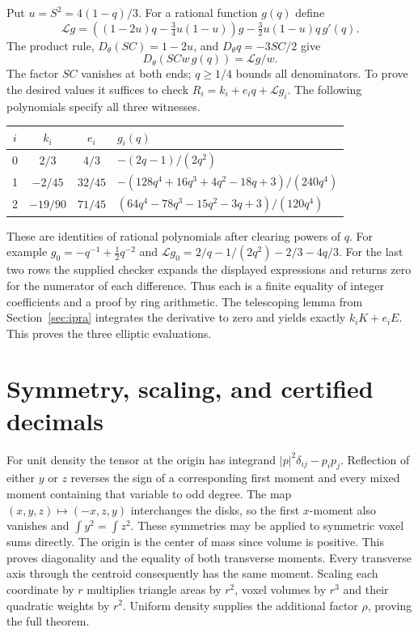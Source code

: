 \documentclass[11pt,letterpaper]{article}
\newcommand{\sect}[1]{\section[#1]{\color{ink}#1}}
\newcommand{\subt}[1]{\par\medskip\noindent{\color{sea}\bfseries #1}\enspace}
\newcommand{\Dth}{D_{\theta}}
\begin{document}
\subt{Exact differentials.}
Put \(u=S^2=4(1-q)/3\). For a rational function \(g(q)\) define
\[
 \mathcal Lg=\left((1-2u)q-\tfrac34u(1-u)\right)g
              -\tfrac32u(1-u)q\,g'(q).
\]
The product rule, \(\Dth(SC)=1-2u\), and \(\Dth q=-3SC/2\) give
\[
 \Dth(SCw\,g(q))=\mathcal Lg/w.
\]
The factor \(SC\) vanishes at both ends; \(q\ge1/4\) bounds all denominators. To prove the desired values it suffices to check \(R_i=k_i+e_iq+\mathcal Lg_i\). The following polynomials specify all three witnesses.
\begin{center}
\renewcommand{\arraystretch}{1.24}
\begin{tabular}{@{}cccl@{}}\toprule
\(i\)&\(k_i\)&\(e_i\)&\(g_i(q)\)\\ \midrule
0 & \(2/3\)&\(4/3\)&\(-(2q-1)/(2q^2)\)\\
1 & \(-2/45\)&\(32/45\)&\(-(128q^4+16q^3+4q^2-18q+3)/(240q^4)\)\\
2 & \(-19/90\)&\(71/45\)&\((64q^4-78q^3-15q^2-3q+3)/(120q^4)\)\\ \bottomrule
\end{tabular}
\end{center}
These are identities of rational polynomials after clearing powers of \(q\). For example \(g_0=-q^{-1}+\tfrac12q^{-2}\) and
\(\mathcal Lg_0=2/q-1/(2q^2)-2/3-4q/3\).
For the last two rows the supplied checker expands the displayed expressions and returns zero for the numerator of each difference. Thus each is a finite equality of integer coefficients and a proof by ring arithmetic. The telescoping lemma from Section~\ref{sec:ipra} integrates the derivative to zero and yields exactly \(k_iK+e_iE\). This proves the three elliptic evaluations.

\newpage
\sect{Symmetry, scaling, and certified decimals}
For unit density the tensor at the origin has integrand \(|p|^2\delta_{ij}-p_i p_j\). Reflection of either \(y\) or \(z\) reverses the sign of a corresponding first moment and every mixed moment containing that variable to odd degree. The map \((x,y,z)\mapsto(-x,z,y)\) interchanges the disks, so the first \(x\)-moment also vanishes and \(\int y^2=\int z^2\). These symmetries may be applied to symmetric voxel sums directly. The origin is the center of mass since volume is positive. This proves diagonality and the equality of both transverse moments. Every transverse axis through the centroid consequently has the same moment. Scaling each coordinate by \(r\) multiplies triangle areas by \(r^2\), voxel volumes by \(r^3\) and their quadratic weights by \(r^2\). Uniform density supplies the additional factor \(\rho\), proving the full theorem.
\end{document}
